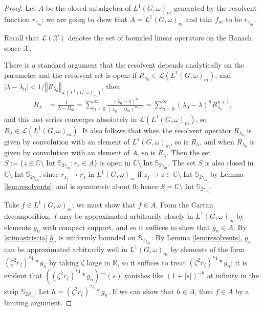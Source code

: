 \documentclass[12pt,a4paper]{amsart}
\theoremstyle{definition}
\theoremstyle{remark}
\numberwithin{equation}{section}
\newcommand{\norm}[1]{\left\Vert#1\right\Vert}
\newcommand{\Int}{\operatorname{Int}}
\newcommand{\afterhat}{\hat{\phantom{m}}}
\newcommand{\R}{\mathbb{R}}
\newcommand{\C}{\mathbb{C}}
\newcommand{\Ban}{\mathcal{X}}
\newcommand{\cL}{\mathcal{L}}
\newcommand{\Strip}{\mathbb{S}}
\newcommand{\var}{s}
\newcommand{\funz}{g}
\newcommand{\funzz}{h}
\begin{document}
\begin{proof}
Let $A$ be the closed subalgebra of $L^1(G,\omega)_m$ generated by the resolvent function $r_{\gamma_m}$; we are going to show that $A = L^1(G,\omega)_m$ and take $f_m$ to be $r_{\gamma_{m}}$.

Recall that $\cL(\Ban)$ denotes the set of bounded linear operators on the Banach space $\Ban$.

There is a standard argument that the resolvent depends analytically on the parameter and the resolvent set is open:
if $R_{\lambda_0}\in \cL(L^1(G,\omega)_m)$, and $|\lambda -\lambda_0| < 1/\norm{R_{\lambda_0}}_{\cL(L^1(G,\omega)_m)}$, then
\begin{align*} %
R_\lambda 
&= \frac{1}{\lambda - \Omega_m} 
= \sum_{n=0}^{\infty} \frac{(\lambda_0-\lambda)^n}{(\lambda_0 - \Omega_m)^{n+1}} 
= \sum_{n=0}^{\infty} (\lambda_0-\lambda)^n R^{n+1}_{\lambda_0},
\end{align*}
and this last series converges absolutely in $\cL(L^1(G,\omega)_m)$, so $R_\lambda \in \cL(L^1(G,\omega)_m)$.
It also follows that when the resolvent operator $R_{\lambda_0}$ is given by convolution with an element of $L^1(G,\omega)_m$, so is $R_\lambda$, and when $R_{\lambda_0}$ is given by convolution with an element of $A$, so is $R_\lambda$.
Then the set $S := \{ z \in \C \setminus \Int \Strip_{2\gamma_m} : r_z \in A \}$ is open in $\C \setminus \Int\Strip_{2\gamma_m}$.
The set $S$ is also closed in $\C \setminus \Int \Strip_{2\gamma_m}$,  since $r_{z_j} \to r_z$ in $L^1(G,\omega)_m$ if $z_j \to z \in \C \setminus \Int \Strip_{2\gamma_m}$ by Lemma \ref{lem:resolvents}, and is symmetric about $0$; hence $S = \C \setminus \Int\Strip_{2\gamma_m}$.


Take $f \in L^1(G,\omega)_m$; we must show that $f \in A$.  
From the Cartan decomposition, $f$ may be approximated arbitrarily closely in $L^1(G,\omega)_m$ by elements $\funz_n$ with compact support, and so it suffices to show that $\funz_n \in A$.
By \eqref{stimastriscia} $\hat \funz_n$ is uniformly bounded on $\Strip_{2\gamma_m}$.
By Lemma \ref{lem:resolvents}, $\funz_n$ can be approximated arbitrarily well in $L^1(G,\omega)_m$ by elements of the form $(\zeta^2 r_\zeta)^{*4}* \funz_n$ by taking $\zeta$ large in $\R$, so it suffices to treat $(\zeta^2 r_\zeta)^{*4} *\funz_n$; it is evident that  $((\zeta^2 r_\zeta)^{*4}* \funz_n)\afterhat (\var)$ vanishes like $(1+|\var|)^{-8}$ at infinity in the strip $\Strip_{2\beta_m}$.
Let $\funzz=(\zeta^2 r_\zeta)^{*4}* \funz_n$. If we can show that $\funzz\in A$, then $f\in A$ by a limiting argument.



\end{proof}
\end{document}
